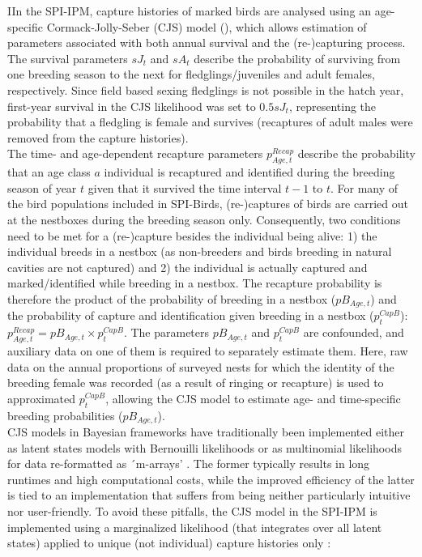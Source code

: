 \documentclass[
]{book}
\begin{document}
IIn the SPI-IPM, capture histories of marked birds are analysed using an age-specific Cormack-Jolly-Seber (CJS) model (\citep{cormack1964, jolly1965, seber1965}), which allows estimation of parameters associated with both annual survival and the (re-)capturing process.\\
The survival parameters \(sJ_t\) and \(sA_t\) describe the probability of surviving from one breeding season to the next for fledglings/juveniles and adult females, respectively. Since field based sexing fledglings is not possible in the hatch year, first-year survival in the CJS likelihood was set to \(0.5sJ_t\), representing the probability that a fledgling is female and survives (recaptures of adult males were removed from the capture histories).\\
The time- and age-dependent recapture parameters \(p_{Age,t}^{Recap}\) describe the probability that an age class \(a\) individual is recaptured and identified during the breeding season of year \(t\) given that it survived the time interval \(t-1\) to \(t\). For many of the bird populations included in SPI-Birds, (re-)captures of birds are carried out at the nestboxes during the breeding season only. Consequently, two conditions need to be met for a (re-)capture besides the individual being alive: 1) the individual breeds in a nestbox (as non-breeders and birds breeding in natural cavities are not captured) and 2) the individual is actually captured and marked/identified while breeding in a nestbox. The recapture probability is therefore the product of the probability of breeding in a nestbox (\(pB_{Age,t}\)) and the probability of capture and identification given breeding in a nestbox (\(p_t^{CapB}\)): \(p_{Age,t}^{Recap}=pB_{Age,t}\times p_t^{CapB}\).
The parameters \(pB_{Age,t}\) and \(p_t^{CapB}\) are confounded, and auxiliary data on one of them is required to separately estimate them. Here, raw data on the annual proportions of surveyed nests for which the identity of the breeding female was recorded (as a result of ringing or recapture) is used to approximated \(p_t^{CapB}\), allowing the CJS model to estimate age- and time-specific breeding probabilities (\(pB_{Age,t}\)).\\
CJS models in Bayesian frameworks have traditionally been implemented either as latent states models with Bernouilli likelihoods or as multinomial likelihoods for data re-formatted as ´m-arrays' \citep{gimenez2007, kery2011}. The former typically results in long runtimes and high computational costs, while the improved efficiency of the latter is tied to an implementation that suffers from being neither particularly intuitive nor user-friendly. To avoid these pitfalls, the CJS model in the SPI-IPM is implemented using a marginalized likelihood (that integrates over all latent states) applied to unique (not individual) capture histories only \citep[following][]{turek2016}:
\end{document}
